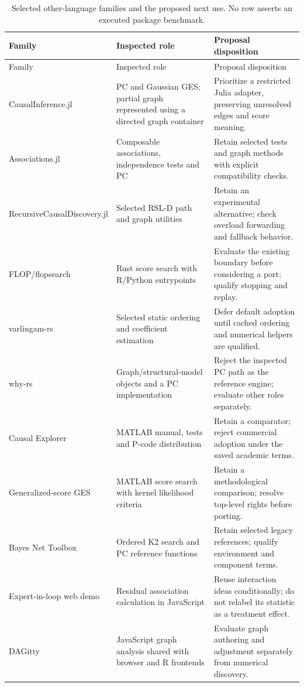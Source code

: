 \begingroup\small
\begin{longtable}{@{}P{.22\linewidth}P{.35\linewidth}P{.35\linewidth}@{}}
\caption{Selected other-language families and the proposed next use. No row
asserts an executed package benchmark.}\label{tab:exec13-other-roles}\\
\toprule Family & Inspected role & Proposal disposition\\
\midrule\endfirsthead
\toprule Family & Inspected role & Proposal disposition\\
\midrule\endhead
CausalInference.jl & PC and Gaussian GES; partial graph represented using a
directed graph container & Prioritize a restricted Julia adapter, preserving
unresolved edges and score meaning.\\
Associations.jl & Composable associations, independence tests and PC & Retain
selected tests and graph methods with explicit compatibility checks.\\
Recursive\allowbreak Causal\allowbreak Discovery.jl & Selected RSL-D path and graph utilities & Retain
an experimental alternative; check overload forwarding and fallback behavior.\\
FLOP/flopsearch & Rust score search with R/Python entrypoints & Evaluate the
existing boundary before considering a port; qualify stopping and replay.\\
varlingam-rs & Selected static ordering and coefficient estimation & Defer
default adoption until cached ordering and numerical helpers are qualified.\\
why-rs & Graph/structural-model objects and a PC implementation & Reject the
inspected PC path as the reference engine; evaluate other roles separately.\\
Causal Explorer & MATLAB manual, tests and P-code distribution & Retain a
comparator; reject commercial adoption under the saved academic terms.\\
Generalized-score GES & MATLAB score search with kernel likelihood criteria &
Retain a methodological comparison; resolve top-level rights before porting.\\
Bayes Net Toolbox & Ordered K2 search and PC reference functions & Retain
selected legacy references; qualify environment and component terms.\\
Expert-in-loop web demo & Residual association calculation in JavaScript &
Reuse interaction ideas conditionally; do not relabel its statistic as a
treatment effect.\\
DAGitty & JavaScript graph analysis shared with browser and R frontends &
Evaluate graph authoring and adjustment separately from numerical discovery.\\
\bottomrule
\end{longtable}
\endgroup

